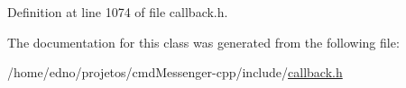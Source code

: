 Definition at line 1074 of file callback.\+h.



The documentation for this class was generated from the following file\+:\begin{DoxyCompactItemize}
\item 
/home/edno/projetos/cmd\+Messenger-\/cpp/include/\hyperlink{callback_8h}{callback.\+h}\end{DoxyCompactItemize}
